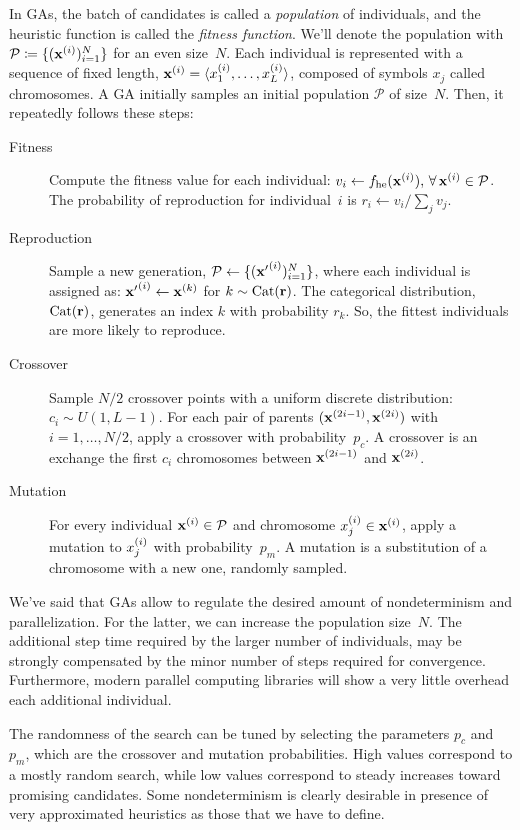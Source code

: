 In GAs, the batch of candidates is called a \emph{population} of individuals,
and the heuristic function is called the \emph{fitness function}. We'll denote
the population with $\mathcal{P} \coloneqq \{(\mathbf{x}^{(i)})_{i=1}^N\}$ for an
even size~$N$. Each individual is represented with a sequence of fixed length,
$\mathbf{x}^{(i)} = \langle x_1^{(i)}, \dots, x_L^{(i)} \rangle$, composed of
symbols $x_j$ called chromosomes. A GA initially samples an initial population
$\mathcal{P}$ of size~$N$. Then, it repeatedly follows these steps:
\begin{description}
	\item [Fitness] Compute the fitness value for each individual: $v_i \gets
		f_{\text{he}}(\mathbf{x}^{(i)}), \, \forall\, \mathbf{x}^{(i)} \in \mathcal{P}$.
		The probability of reproduction for individual~$i$ is $r_i \gets v_i /
		\sum_j v_j$.
	\item [Reproduction] Sample a new generation, $\mathcal{P} \gets
		\{({\mathbf{x}'}^{(i)})_{i=1}^N\}$, where each individual is assigned as:
		${\mathbf{x}'}^{(i)} \gets \mathbf{x}^{(k)}$ for $k \sim \operatorname{Cat}(\mathbf{r})$. The
		categorical distribution, $\operatorname{Cat}(\mathbf{r})$, generates an index $k$ with
		probability $r_k$.  So, the fittest individuals are more likely to
		reproduce.
	\item [Crossover] Sample $N/2$ crossover points with a uniform discrete
		distribution: ${c_i \sim U(1, L-1)}$. For each pair of parents
		$(\mathbf{x}^{(2i-1)}, \mathbf{x}^{(2i)})$ with $i=1, \dots, N/2$, apply a crossover
		with probability~$p_c$. A crossover is an exchange the first $c_i$
		chromosomes between $\mathbf{x}^{(2i-1)}$ and $\mathbf{x}^{(2i)}$.
	\item [Mutation] For every individual $\mathbf{x}^{(i)} \in \mathcal{P}$ and
		chromosome $x_j^{(i)} \in \mathbf{x}^{(i)}$, apply a mutation to
		$x_j^{(i)}$ with probability~$p_m$. A mutation is a substitution of a
		chromosome with a new one, randomly sampled.
\end{description}

We've said that GAs allow to regulate the desired amount of nondeterminism and
parallelization. For the latter, we can increase the population size~$N$.
The additional step time required by the larger number of individuals, may be
strongly compensated by the minor number of steps required for convergence.
Furthermore, modern parallel computing libraries will show a very little
overhead each additional individual.

The randomness of the search can be tuned by selecting the parameters $p_c$
and $p_m$, which are the crossover and mutation probabilities. High values
correspond to a mostly random search, while low values correspond to steady
increases toward promising candidates. Some nondeterminism is clearly
desirable in presence of very approximated heuristics as those that we have to
define.

